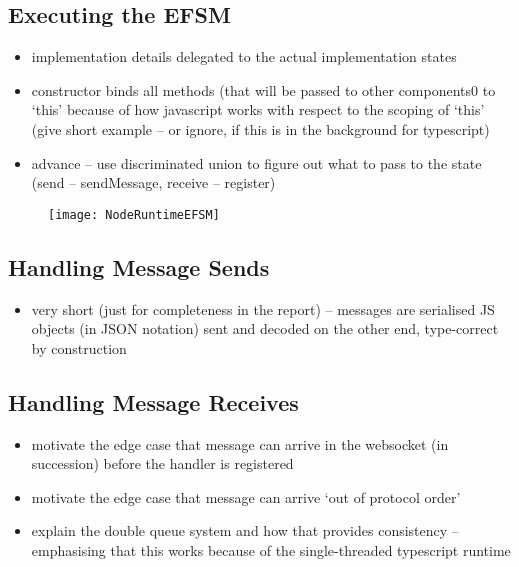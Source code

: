 \subsection{Executing the EFSM}
\begin{itemize}
\item implementation details delegated to the actual implementation states
\item constructor binds all methods (that will be passed to other components0 to `this' because of how javascript works with respect to the scoping of `this' (give short example -- or ignore, if this is in the background for typescript)
\item advance -- use discriminated union to figure out what to pass to the state (send -- sendMessage, receive -- register)
\end{itemize}

\begin{figure}[!ht]
\centering
\texttt{[image: NodeRuntimeEFSM]}
\label{fig:noderuntimeefsm}
\end{figure}

\subsection{Handling Message Sends}
\begin{itemize}
\item very short (just for completeness in the report) -- messages are serialised JS objects (in JSON notation) sent and decoded on the other end, type-correct by construction
\end{itemize}

\subsection{Handling Message Receives}
\begin{itemize}
\item motivate the edge case that message can arrive in the websocket (in succession) before the handler is registered
\item motivate the edge case that message can arrive `out of protocol order' 
\item explain the double queue system and how that provides consistency -- emphasising that this works because of the single-threaded typescript runtime
\end{itemize}

